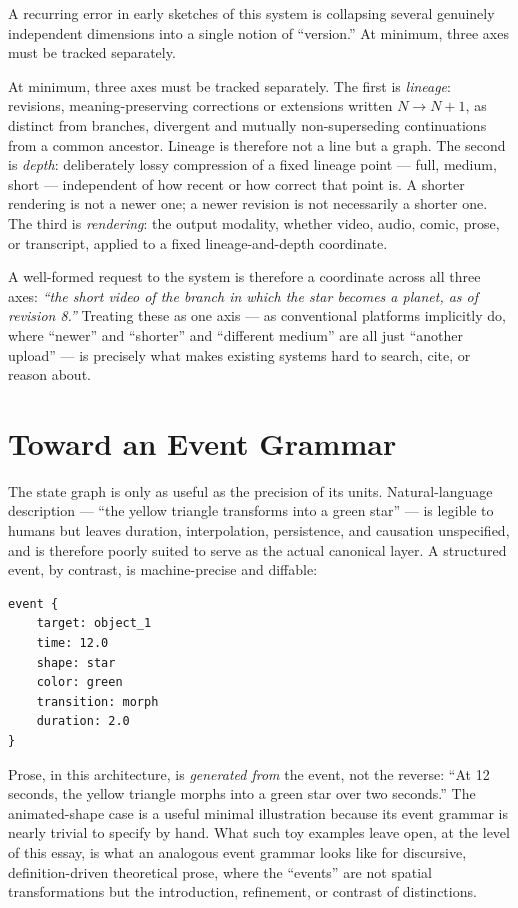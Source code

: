 \documentclass[11pt]{article}
\theoremstyle{definition}
\begin{document}
A recurring error in early sketches of this system is collapsing several genuinely independent dimensions into a single notion of ``version.'' At minimum, three axes must be tracked separately.

At minimum, three axes must be tracked separately. The first is \emph{lineage}: revisions, meaning-preserving corrections or extensions written $N \to N+1$, as distinct from branches, divergent and mutually non-superseding continuations from a common ancestor. Lineage is therefore not a line but a graph. The second is \emph{depth}: deliberately lossy compression of a fixed lineage point --- full, medium, short --- independent of how recent or how correct that point is. A shorter rendering is not a newer one; a newer revision is not necessarily a shorter one. The third is \emph{rendering}: the output modality, whether video, audio, comic, prose, or transcript, applied to a fixed lineage-and-depth coordinate.

A well-formed request to the system is therefore a coordinate across all three axes: \emph{``the short video of the branch in which the star becomes a planet, as of revision 8.''} Treating these as one axis --- as conventional platforms implicitly do, where ``newer'' and ``shorter'' and ``different medium'' are all just ``another upload'' --- is precisely what makes existing systems hard to search, cite, or reason about.

\section{Toward an Event Grammar}
\label{sec:event-grammar}

The state graph is only as useful as the precision of its units. Natural-language description --- ``the yellow triangle transforms into a green star'' --- is legible to humans but leaves duration, interpolation, persistence, and causation unspecified, and is therefore poorly suited to serve as the actual canonical layer. A structured event, by contrast, is machine-precise and diffable:

\begin{verbatim}
event {
    target: object_1
    time: 12.0
    shape: star
    color: green
    transition: morph
    duration: 2.0
}
\end{verbatim}

Prose, in this architecture, is \emph{generated from} the event, not the reverse: ``At 12 seconds, the yellow triangle morphs into a green star over two seconds.'' The animated-shape case is a useful minimal illustration because its event grammar is nearly trivial to specify by hand. What such toy examples leave open, at the level of this essay, is what an analogous event grammar looks like for discursive, definition-driven theoretical prose, where the ``events'' are not spatial transformations but the introduction, refinement, or contrast of distinctions.
\end{document}
